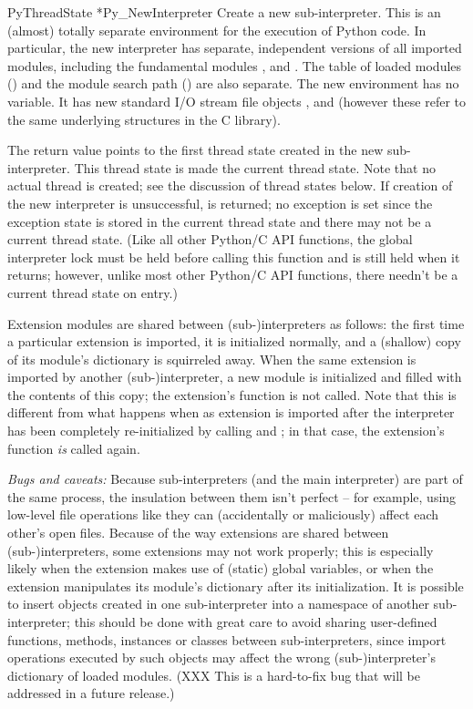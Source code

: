 \begin{cfuncdesc}{PyThreadState *}{Py_NewInterpreter}{}
Create a new sub-interpreter.  This is an (almost) totally separate 
environment for the execution of Python code.  In particular, the new 
interpreter has separate, independent versions of all imported 
modules, including the fundamental modules , 
 and .  The table of loaded modules 
() and the module search path () are 
also separate.  The new environment has no  variable.  
It has new standard I/O stream file objects , 
 and  (however these refer to the 
same underlying  structures in the C library).

The return value points to the first thread state created in the new 
sub-interpreter.  This thread state is made the current thread state.  
Note that no actual thread is created; see the discussion of thread 
states below.  If creation of the new interpreter is unsuccessful, 
\NULL{} is returned; no exception is set since the exception state 
is stored in the current thread state and there may not be a current 
thread state.  (Like all other Python/C API functions, the global 
interpreter lock must be held before calling this function and is 
still held when it returns; however, unlike most other Python/C API 
functions, there needn't be a current thread state on entry.)

Extension modules are shared between (sub-)interpreters as follows: 
the first time a particular extension is imported, it is initialized 
normally, and a (shallow) copy of its module's dictionary is 
squirreled away.  When the same extension is imported by another 
(sub-)interpreter, a new module is initialized and filled with the 
contents of this copy; the extension's  function is not 
called.  Note that this is different from what happens when as 
extension is imported after the interpreter has been completely 
re-initialized by calling  and 
; in that case, the extension's  
function \emph{is} called again.

\emph{Bugs and caveats:} Because sub-interpreters (and the main 
interpreter) are part of the same process, the insulation between them 
isn't perfect -- for example, using low-level file operations like 
 they can (accidentally or maliciously) affect each 
other's open files.  Because of the way extensions are shared between 
(sub-)interpreters, some extensions may not work properly; this is 
especially likely when the extension makes use of (static) global 
variables, or when the extension manipulates its module's dictionary 
after its initialization.  It is possible to insert objects created in 
one sub-interpreter into a namespace of another sub-interpreter; this 
should be done with great care to avoid sharing user-defined 
functions, methods, instances or classes between sub-interpreters, 
since import operations executed by such objects may affect the 
wrong (sub-)interpreter's dictionary of loaded modules.  (XXX This is 
a hard-to-fix bug that will be addressed in a future release.)
\end{cfuncdesc}


